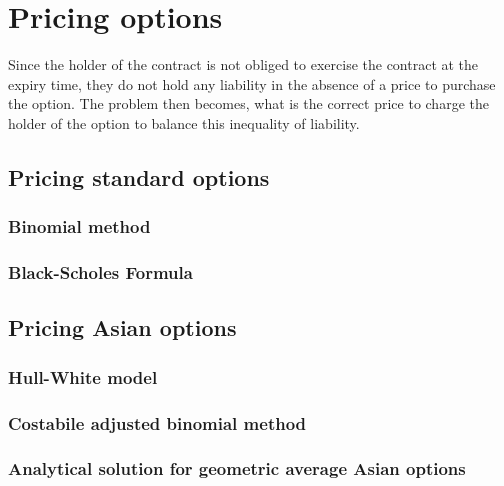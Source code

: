 \section{Pricing options}

Since the holder of the contract is not obliged to exercise the contract at the expiry time, they do not hold any liability in the absence of a price to purchase the option. The problem then becomes, what is the correct price to charge the holder of the option to balance this inequality of liability.

\subsection{Pricing standard options}

\subsubsection{Binomial method}

\subsubsection{Black-Scholes Formula}

\subsection{Pricing Asian options}

\subsubsection{Hull-White model}

\subsubsection{Costabile adjusted binomial method}

\subsubsection{Analytical solution for geometric average Asian options}